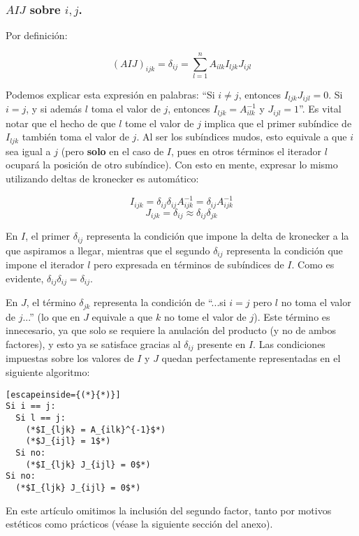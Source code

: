 \subsubsection{$AIJ$ sobre $i, j$.}

Por definición:

$$(AIJ)_{ijk} = \delta_{ij} = \sum\limits^{n}_{l = 1} A_{ilk} I_{ljk} J_{ijl}$$

Podemos explicar esta expresión en palabras: ``Si $i \neq j$, entonces $I_{ljk} J_{ijl} = 0$. Si $i = j$, y si además $l$ toma el valor de $j$, entonces $I_{ljk} = A^{-1}_{ilk}$ y $J_{ijl} = 1$''. Es vital notar que el hecho de que $l$ tome el valor de $j$ implica que el primer subíndice de $I_{ljk}$ también toma el valor de $j$. Al ser los subíndices mudos, esto equivale a que $i$ sea igual a $j$ (pero \textbf{solo} en el caso de $I$, pues en otros términos el iterador $l$ ocupará la posición de otro subíndice). Con esto en mente, expresar lo mismo utilizando deltas de kronecker es automático:

$$I_{ijk} = \delta_{ij} \delta_{ij} A_{ijk}^{-1} = \delta_{ij} A_{ijk}^{-1}$$
$$J_{ijk} = \delta_{ij} \approx \delta_{ij} \delta_{jk}$$

En $I$, el primer $\delta_{ij}$ representa la condición que impone la delta de kronecker a la que aspiramos a llegar, mientras que el segundo $\delta_{ij}$ representa la condición que impone el iterador $l$ pero expresada en términos de subíndices de $I$. Como es evidente, $\delta_{ij} \delta_{ij} = \delta_{ij}$.

En $J$, el término $\delta_{jk}$ representa la condición de ``...si $i = j$ pero $l$ no toma el valor de $j$...'' (lo que en $J$ equivale a que $k$ no tome el valor de $j$). Este término es innecesario, ya que solo se requiere la anulación del producto (y no de ambos factores), y esto ya se satisface gracias al $\delta_{ij}$ presente en $I$. Las condiciones impuestas sobre los valores de $I$ y $J$ quedan perfectamente representadas en el siguiente algoritmo:

\begin{lstlisting}[escapeinside={(*}{*)}]
Si i == j:
  Si l == j:
    (*$I_{ljk} = A_{ilk}^{-1}$*)
    (*$J_{ijl} = 1$*)
  Si no:
    (*$I_{ljk} J_{ijl} = 0$*)
Si no:
  (*$I_{ljk} J_{ijl} = 0$*)	
\end{lstlisting}

En este artículo omitimos la inclusión del segundo factor, tanto por motivos estéticos como prácticos (véase la siguiente sección del anexo).

